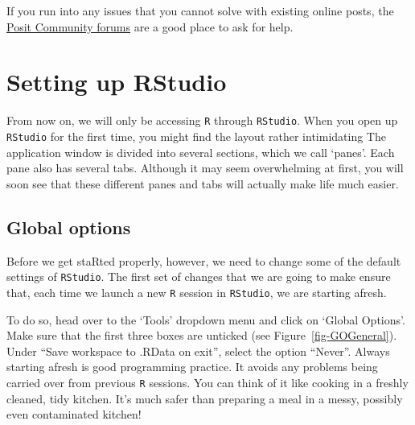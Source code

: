 \documentclass[
  letterpaper,
  DIV=11,
  numbers=noendperiod,
  oneside]{scrreprt}
\begin{document}
If you run into any issues that you cannot solve with existing online
posts, the \href{https://forum.posit.co/}{Posit Community forums} are a
good place to ask for help.

\section{Setting up RStudio}\label{setting-up-rstudio}

From now on, we will only be accessing \texttt{R} through
\texttt{RStudio}. When you open up \texttt{RStudio} for the first time,
you might find the layout rather intimidating The application window is
divided into several sections, which we call `panes'. Each pane also has
several tabs. Although it may seem overwhelming at first, you will soon
see that these different panes and tabs will actually make life much
easier.

\subsection{Global options}\label{global-options}

Before we get staRted properly, however, we need to change some of the
default settings of \texttt{RStudio}. The first set of changes that we
are going to make ensure that, each time we launch a new \texttt{R}
session in \texttt{RStudio}, we are starting afresh.

To do so, head over to the `Tools' dropdown menu and click on `Global
Options'. Make sure that the first three boxes are unticked (see
Figure~\ref{fig-GOGeneral}). Under ``Save workspace to .RData on exit'',
select the option ``Never''. Always starting afresh is good programming
practice. It avoids any problems being carried over from previous
\texttt{R} sessions. You can think of it like cooking in a freshly
cleaned, tidy kitchen. It's much safer than preparing a meal in a messy,
possibly even contaminated kitchen! {}
\end{document}
